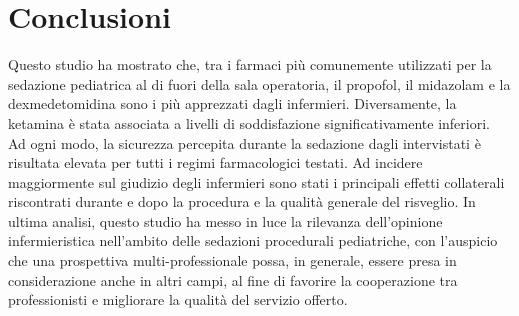 \chapter{Conclusioni}

Questo studio ha mostrato che, tra i farmaci più comunemente utilizzati per la sedazione pediatrica al di fuori della sala operatoria, il propofol, il midazolam e la dexmedetomidina sono i più apprezzati dagli infermieri. Diversamente, la ketamina è stata associata a livelli di soddisfazione significativamente inferiori. Ad ogni modo, la sicurezza percepita durante la sedazione dagli intervistati è risultata elevata per tutti i regimi farmacologici testati. Ad incidere maggiormente sul giudizio degli infermieri sono stati i principali effetti collaterali riscontrati durante e dopo la procedura e la qualità generale del risveglio. 
In ultima analisi, questo studio ha messo in luce la rilevanza dell'opinione infermieristica nell'ambito delle sedazioni procedurali pediatriche, con l'auspicio che una prospettiva multi-professionale possa, in generale, essere presa in considerazione anche in altri campi, al fine di favorire la cooperazione tra professionisti e migliorare la qualità del servizio offerto. 